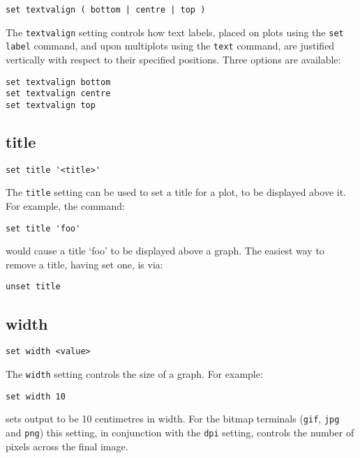 \begin{verbatim}
set textvalign ( bottom | centre | top )
\end{verbatim}

The {\tt textvalign} setting controls how text labels, placed on plots using the
{\tt set label} command, and upon multiplots using the {\tt text} command, are
justified vertically with respect to their specified positions. Three options
are available:

\begin{verbatim}
set textvalign bottom 
set textvalign centre
set textvalign top
\end{verbatim}

\subsection{title}

\begin{verbatim}
set title '<title>'
\end{verbatim}

The {\tt title} setting can be used to set a title for a plot, to be displayed
above it.  For example, the command:

\begin{verbatim}
set title 'foo'
\end{verbatim}

\noindent would cause a title `foo' to be displayed above a graph. The easiest
way to remove a title, having set one, is via:

\begin{verbatim}
unset title
\end{verbatim}
   
\subsection{width}

\begin{verbatim}
set width <value>
\end{verbatim}

The {\tt width} setting controls the size of a graph.  For example:

\begin{verbatim}
set width 10
\end{verbatim}

\noindent sets output to be 10 centimetres in width.  For the bitmap terminals ({\tt gif},
{\tt jpg} and {\tt png}) this setting, in conjunction with the {\tt dpi}
setting, controls the number of pixels across the final image.

